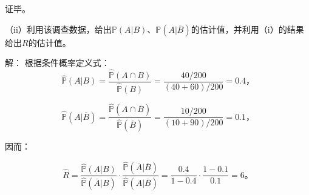 \documentclass[a4paper,12pt]{article}
\newcommand{\p}[1]{\mathbb{P}\left(#1\right)}
\newcommand{\ph}[1]{\widehat{\mathbb{P}}\left(#1\right)}
\renewcommand{\bar}[1]{\overline{#1}}
\begin{document}
证毕。

\newpage

\color{black}
（ii）利用该调查数据，给出$\p{A|B}$、$\p{A|\bar{B}}$的估计值，并利用（i）的结果给出$R$的估计值。

\color{blue}
解：
根据条件概率定义式：
\[ \ph{A|B} = \frac{\ph{A \cap B}}{\ph{B}} = \frac{40/200}{(40+60)/200} = 0.4， \]

\[ \ph{A|\bar{B}} = \frac{\ph{A \cap \bar{B}}}{\ph{\bar{B}}} = \frac{10/200}{(10+90)/200} = 0.1， \]

因而：

\[ \widehat{R} = \frac{\ph{A|B}}{\ph{\bar{A}|B}} \cdot \frac{\ph{\bar{A}|\bar{B}}}{\ph{A|\bar{B}}} = \frac{0.4}{1-0.4} \cdot \frac{1-0.1}{0.1} = 6。 \]
\end{document}
